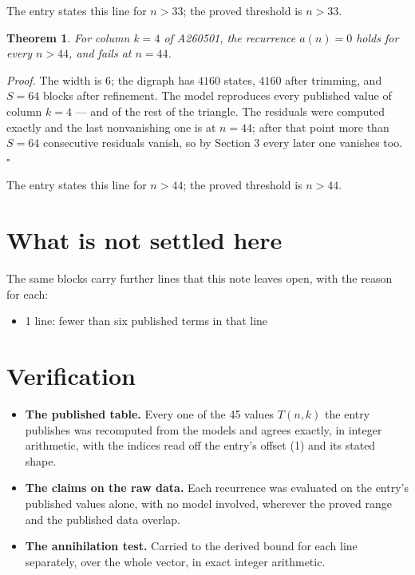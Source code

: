 \documentclass[11pt]{article}
\newtheorem{theorem}{Theorem}
\theoremstyle{definition}
\begin{document}
The entry states this line for $n > 33$; the proved threshold is $n > 33$.

\begin{theorem} For column $k = 4$ of A260501, the recurrence $a(n) = 0$ holds for every $n > 44$, and fails at $n = 44$.\end{theorem}

{\itshape Proof.} The width is $6$; the digraph has $4160$ states, $4160$ after trimming, and $S = 64$ blocks after refinement. The model reproduces every published value of column $k = 4$ --- and of the rest of the triangle. The residuals were computed exactly and the last nonvanishing one is at $n = 44$; after that point more than $S = 64$ consecutive residuals vanish, so by Section 3 every later one vanishes too. $\square$

The entry states this line for $n > 44$; the proved threshold is $n > 44$.

\section{What is not settled here}

The same blocks carry further lines that this note leaves open, with the reason for each:

\begin{itemize}

\item 1 line: fewer than six published terms in that line

\end{itemize}

\section{Verification}

\begin{itemize}

\item {\bfseries The published table.} Every one of the 45 values $T(n,k)$ the entry publishes was recomputed from the models and agrees exactly, in integer arithmetic, with the indices read off the entry's offset (1) and its stated shape.

\item {\bfseries The claims on the raw data.} Each recurrence was evaluated on the entry's published values alone, with no model involved, wherever the proved range and the published data overlap.

\item {\bfseries The annihilation test.} Carried to the derived bound for each line separately, over the whole vector, in exact integer arithmetic.

\end{itemize}
\end{document}
